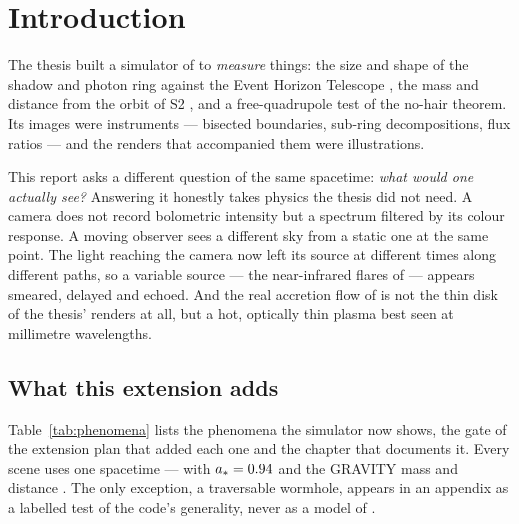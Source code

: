 \chapter{Introduction}
\label{ch:xintro}

The thesis built a simulator of \sgra{} to \emph{measure} things: the size and
shape of the shadow and photon ring against the Event Horizon Telescope
\citep{EHT2022}, the mass and distance from the orbit of S2
\citep{Gillessen2017, Gravity2018, Gravity2020, Gravity2022}, and a
free-quadrupole test of the no-hair theorem. Its images were instruments ---
bisected boundaries, sub-ring decompositions, flux ratios --- and the renders
that accompanied them were illustrations.

This report asks a different question of the same spacetime: \emph{what
would one actually see?} Answering it honestly takes physics the thesis did
not need. A camera does not record bolometric intensity but a spectrum
filtered by its colour response. A moving observer sees a different sky from
a static one at the same point. The light reaching the camera now left its
source at different times along different paths, so a variable source ---
the near-infrared flares of \sgra{} --- appears smeared, delayed and echoed.
And the real accretion flow of \sgra{} is not the thin disk of the thesis'
renders at all, but a hot, optically thin plasma best seen at millimetre
wavelengths.

\section{What this extension adds}

Table~\ref{tab:phenomena} lists the phenomena the simulator now shows, the
gate of the extension plan that added each one and the chapter that
documents it. Every scene uses one spacetime --- \sgra{} with $a_* = 0.94$
\citep{EHT2022} and the GRAVITY mass and distance \citep{Gravity2022}. The
only exception, a traversable wormhole, appears in an appendix as a labelled
test of the code's generality, never as a model of \sgra{}.

